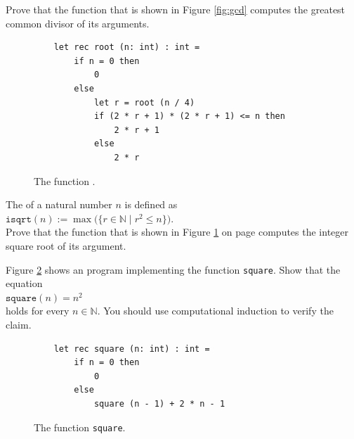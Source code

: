 \exerciseEng
Prove that the function  that is shown in Figure \ref{fig:gcd} computes the greatest common divisor
of its arguments. \eox

\begin{figure}[!h]
  \centering
\begin{verbatim}
    let rec root (n: int) : int =
        if n = 0 then
            0
        else
            let r = root (n / 4)
            if (2 * r + 1) * (2 * r + 1) <= n then
                2 * r + 1
            else
                2 * r
\end{verbatim}
\vspace*{-0.3cm}
  \caption{The function .}
  \label{fig:isqrt}
\end{figure} 

\exerciseEng
The  of a natural number $n$ is defined as 
\\[0.2cm]
\hspace*{1.3cm}
$\texttt{isqrt}(n) := \max\bigl(\{ r \in \mathbb{N} \mid r^2 \leq n \}\bigr)$.
\\[0.2cm]
Prove that the function  that is shown in Figure \ref{fig:isqrt} on page \pageref{fig:isqrt}
computes the integer square root of its argument. \eox
\pagebreak

\exerciseEng
Figure \ref{fig:square} shows an \Fsharp{} program implementing the function \texttt{square}.  Show that the equation
\\[0.2cm]
\hspace*{1.3cm}
$\mathtt{square}(n) = n^2$
\\[0.2cm]
holds for every $n \in \mathbb{N}$.  You should use computational induction to verify the claim. \eox

\begin{figure}[!ht]
\centering
\begin{verbatim}
    let rec square (n: int) : int =
        if n = 0 then
            0
        else
            square (n - 1) + 2 * n - 1
\end{verbatim}
\vspace*{-0.3cm}
\caption{The function \texttt{square}.}
\label{fig:square}
\end{figure}

